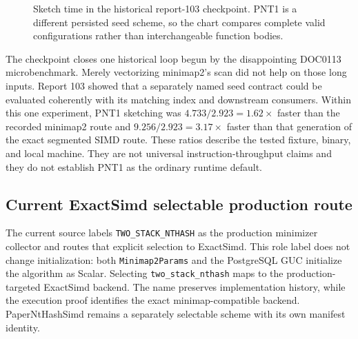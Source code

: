 \begin{figure}[htbp]
\centering
{}
\caption{Sketch time in the historical report-103 checkpoint. PNT1 is a
different persisted seed scheme, so the chart compares complete valid
configurations rather than interchangeable function bodies.}
\label{fig:cpu-report103-minimizers}
\end{figure}

The checkpoint closes one historical loop begun by the disappointing DOC0113
microbenchmark. Merely vectorizing minimap2's scan did not help on those long
inputs. Report 103 showed that a separately named seed contract could be
evaluated coherently with its matching index and downstream consumers. Within
this one experiment, PNT1 sketching was
$4.733/2.923=1.62\times$ faster than the recorded minimap2 route and
$9.256/2.923=3.17\times$ faster than that generation of the exact segmented
SIMD route. These ratios describe the tested fixture, binary, and local
machine. They are not universal instruction-throughput claims and they do not
establish PNT1 as the ordinary runtime default.

\subsection{Current ExactSimd selectable production route}

The current source labels \texttt{TWO\_STACK\_NTHASH} as the production
minimizer collector and routes that explicit selection to ExactSimd. This role
label does not change initialization: both \texttt{Minimap2Params} and the
PostgreSQL GUC initialize the algorithm as Scalar. Selecting
\texttt{two\_stack\_nthash} maps to the production-targeted ExactSimd backend.
The name preserves implementation history, while the execution proof
identifies the exact minimap-compatible backend. PaperNtHashSimd remains a
separately selectable scheme with its own manifest identity.


